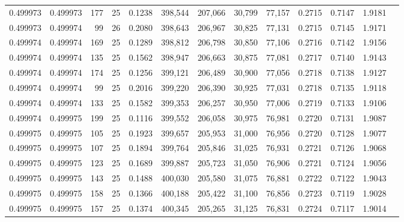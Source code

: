 \begin{tabular}{rrrrrrrrrrrrr}
0.499973 & 0.499973 &   177 &  25 &                                     0.1238 & 398,544 & 207,066 &  30,799 &  77,157 & 0.2715 & 0.7147 & 1.9181 \\
0.499973 & 0.499974 &    99 &  26 &                                     0.2080 & 398,643 & 206,967 &  30,825 &  77,131 & 0.2715 & 0.7145 & 1.9171 \\
0.499974 & 0.499974 &   169 &  25 &                                     0.1289 & 398,812 & 206,798 &  30,850 &  77,106 & 0.2716 & 0.7142 & 1.9156 \\
0.499974 & 0.499974 &   135 &  25 &                                     0.1562 & 398,947 & 206,663 &  30,875 &  77,081 & 0.2717 & 0.7140 & 1.9143 \\
0.499974 & 0.499974 &   174 &  25 &                                     0.1256 & 399,121 & 206,489 &  30,900 &  77,056 & 0.2718 & 0.7138 & 1.9127 \\
0.499974 & 0.499974 &    99 &  25 &                                     0.2016 & 399,220 & 206,390 &  30,925 &  77,031 & 0.2718 & 0.7135 & 1.9118 \\
0.499974 & 0.499974 &   133 &  25 &                                     0.1582 & 399,353 & 206,257 &  30,950 &  77,006 & 0.2719 & 0.7133 & 1.9106 \\
0.499974 & 0.499975 &   199 &  25 &                                     0.1116 & 399,552 & 206,058 &  30,975 &  76,981 & 0.2720 & 0.7131 & 1.9087 \\
0.499975 & 0.499975 &   105 &  25 &                                     0.1923 & 399,657 & 205,953 &  31,000 &  76,956 & 0.2720 & 0.7128 & 1.9077 \\
0.499975 & 0.499975 &   107 &  25 &                                     0.1894 & 399,764 & 205,846 &  31,025 &  76,931 & 0.2721 & 0.7126 & 1.9068 \\
0.499975 & 0.499975 &   123 &  25 &                                     0.1689 & 399,887 & 205,723 &  31,050 &  76,906 & 0.2721 & 0.7124 & 1.9056 \\
0.499975 & 0.499975 &   143 &  25 &                                     0.1488 & 400,030 & 205,580 &  31,075 &  76,881 & 0.2722 & 0.7122 & 1.9043 \\
0.499975 & 0.499975 &   158 &  25 &                                     0.1366 & 400,188 & 205,422 &  31,100 &  76,856 & 0.2723 & 0.7119 & 1.9028 \\
0.499975 & 0.499975 &   157 &  25 &                                     0.1374 & 400,345 & 205,265 &  31,125 &  76,831 & 0.2724 & 0.7117 & 1.9014 \\

\end{tabular}
